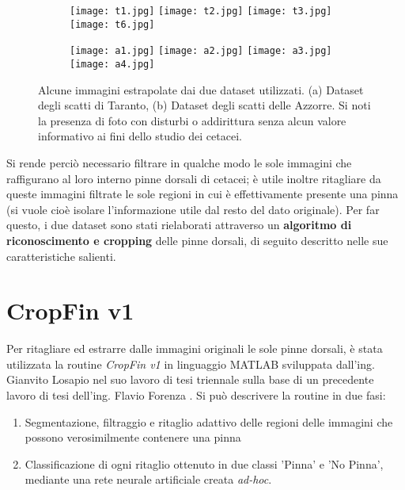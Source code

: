 \begin{figure}[h]

  \centering
  
  \begin{subfigure}[b]{\textwidth}
    \texttt{[image: t1.jpg]}
    \hfill
    \texttt{[image: t2.jpg]}
    \hfill
    \texttt{[image: t3.jpg]}
    \hfill
    \texttt{[image: t6.jpg]}
    \caption{}
  \end{subfigure}
  
  \vspace{5mm}
  
  \begin{subfigure}[b]{\textwidth}
    \texttt{[image: a1.jpg]}
    \hfill
    \texttt{[image: a2.jpg]}
    \hfill
    \texttt{[image: a3.jpg]}
    \hfill
    \texttt{[image: a4.jpg]}
    \caption{}
  \end{subfigure}
  
  \caption{Alcune immagini estrapolate dai due dataset utilizzati. (a) Dataset degli scatti di Taranto, (b) Dataset degli scatti delle Azzorre. Si noti la presenza di foto con disturbi o addirittura senza alcun valore informativo ai fini dello studio dei cetacei.}
  \label{fig:esempiDataset}
\end{figure}

Si rende perciò necessario filtrare in qualche modo le sole immagini che raffigurano al loro interno pinne dorsali di cetacei; è utile inoltre ritagliare da queste immagini filtrate le sole regioni in cui è effettivamente presente una pinna (si vuole cioè isolare l'informazione utile dal resto del dato originale). Per far questo, i due dataset sono stati rielaborati attraverso un \textbf{algoritmo di riconoscimento e cropping} delle pinne dorsali, di seguito descritto nelle sue caratteristiche salienti.

\section{CropFin v1}
Per ritagliare ed estrarre dalle immagini originali le sole pinne dorsali, è stata utilizzata la routine \textit{CropFin v1} in linguaggio MATLAB sviluppata dall'ing. Gianvito Losapio nel suo lavoro di tesi triennale \cite{gianvito} sulla base di un precedente lavoro di tesi dell'ing. Flavio Forenza \cite{flavio}.
Si può descrivere la routine in due fasi:
\begin{enumerate}
\item Segmentazione, filtraggio e ritaglio adattivo delle regioni delle immagini che possono verosimilmente contenere una pinna
\item Classificazione di ogni ritaglio ottenuto in due classi 'Pinna' e 'No Pinna', mediante una rete neurale artificiale creata \textit{ad-hoc}.
\end{enumerate}

